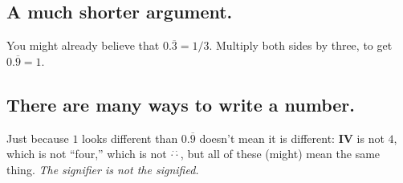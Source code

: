 \documentclass[11pt,letterpaper]{article}
\begin{document}
\subsection*{A much shorter argument.}

You might already believe that $0.\overline{3} = 1/3$.  Multiply both
sides by three, to get $0.\overline{9} = 1$.

\subsection*{There are many ways to write a number.}

Just because $1$ looks different than $0.\overline{9}$ doesn't mean it
is different: \textbf{IV} is not $4$, which is not ``four,'' which is
not $\stackrel{\cdot \cdot}{\cdot \cdot}$, but all of these (might) mean the same
thing.  \textit{The signifier is not the signified.}
\end{document}
